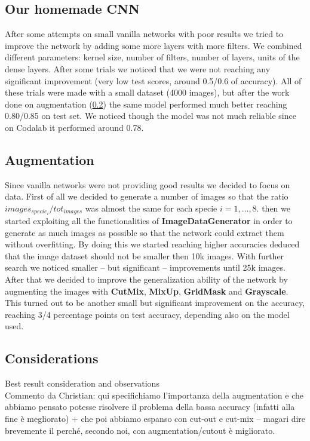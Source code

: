 \documentclass[10pt]{article}
\begin{document}
\subsection{Our homemade CNN}
After some attempts on small vanilla networks with poor results we tried to improve the network by adding some more layers with more filters.
We combined different parameters: kernel size, number of filters, number of layers, units of the dense layers.
After some trials we noticed that we were not reaching any significant improvement (very low test scores, around 0.5/0.6 of accuracy).
All of these trials were made with a small dataset (4000 images), but after the work done on augmentation (\ref{subsec:augmentation}) the same model performed much better reaching 0.80/0.85 on test set.
We noticed though the model was not much reliable since on Codalab it performed around 0.78.


\subsection{Augmentation}\label{subsec:augmentation}
Since vanilla networks were not providing good results we decided to focus on data.
First of all we decided to generate a number of images so that the ratio $images_{specie_i}/tot_{images}$ was almost the same for each specie $i=1,\dots,8$.
then we started exploiting all the functionalities of \textbf{ImageDataGenerator} in order to generate as much images as possible so that the network could extract them without overfitting.
By doing this we started reaching higher accuracies deduced that the image dataset should not be smaller then 10k images.
With further search we noticed smaller -- but significant -- improvements until 25k images.
After that we decided to improve the generalization ability of the network by augmenting the images with \textbf{CutMix}, \textbf{MixUp}, \textbf{GridMask} and \textbf{Grayscale}.
This turned out to be another small but significant improvement on the accuracy, reaching 3/4 percentage points on test accuracy, depending also on the model used.



\subsection{Considerations}
Best result consideration and observations \\
Commento da Christian: qui specifichiamo l'importanza della augmentation e che abbiamo pensato potesse risolvere il problema della bassa accuracy (infatti alla fine è megliorato) + che poi abbiamo espanso con cut-out e cut-mix -- magari dire brevemente il perché, secondo noi, con augmentation/cutout è migliorato.
\end{document}
